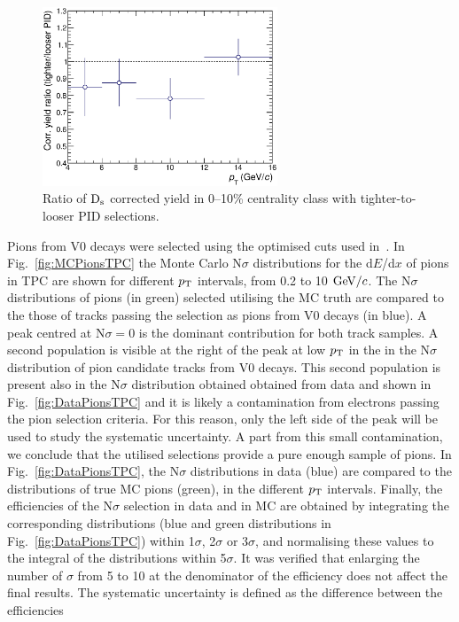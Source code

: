 \begin{figure}[!h]
 \centering
 \includegraphics[angle=0, width=7cm]{./FigCap5/PIDsyst_010.eps}
 \caption{Ratio of ${\rm D_s}$ corrected yield in 0--10\% centrality class with tighter-to-looser PID selections.}
 \label{fig:DsPID010} 
\end{figure}
Pions from V0 decays were selected using the optimised cuts
used in~\cite{Schuchmann:2102194}. In Fig.~\ref{fig:MCPionsTPC} the Monte Carlo 
N$\sigma$ distributions for the d$E$/d$x$ of pions in TPC are shown for 
different $p_{\rm T}$ intervals, from 0.2 to 10 $\mathrm{GeV}/c$.
The N$\sigma$ distributions of pions (in green) selected utilising the MC truth are compared to the
those of tracks passing the selection as pions from V0 decays 
(in blue). A peak centred at N$\sigma=0$ is the dominant contribution for both
track samples.
A second population is visible at the right of the peak at low $p_{\rm T}$ in the in the N$\sigma$ distribution
of pion candidate tracks from V0 decays. This second population is present
also in the N$\sigma$ distribution obtained obtained from data and shown in
Fig.~\ref{fig:DataPionsTPC} and it is likely a contamination from electrons passing
the pion selection criteria. For this reason, 
only the left side of the peak will be used to study the systematic uncertainty.
A part from this small contamination, we conclude that the utilised selections provide a pure
enough sample of pions. 
In Fig.~\ref{fig:DataPionsTPC}, the N$\sigma$ distributions in data (blue) are compared
to the distributions of true MC pions (green), in the different $p_{\rm T}$ intervals.  
Finally, the efficiencies of the N$\sigma$ selection in data and in MC are obtained by integrating the corresponding 
distributions (blue and green distributions in Fig.~\ref{fig:DataPionsTPC})
within 1$\sigma$, 2$\sigma$ or 3$\sigma$, and normalising these values to the integral 
of the distributions within 5$\sigma$. It was verified that enlarging the number of $\sigma$ from 5 to 10 at the 
denominator of the efficiency does not affect the final results.
The systematic uncertainty is defined as the difference between the efficiencies 
